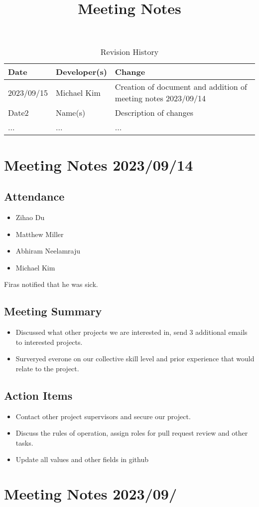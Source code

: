 \documentclass{article}
\title{Meeting Notes\\\progname}
\author{\authname}
\date{}
\begin{document}
\maketitle

\begin{table}[hp]
\caption{Revision History} \label{TblRevisionHistory}
\begin{tabularx}{\textwidth}{llX}
\toprule
\textbf{Date} & \textbf{Developer(s)} & \textbf{Change}\\
\midrule
2023/09/15 & Michael Kim & Creation of document and addition of meeting notes 2023/09/14 \\
Date2 & Name(s) & Description of changes\\
... & ... & ...\\
\bottomrule
\end{tabularx}
\end{table}

\section*{Meeting Notes 2023/09/14}

\subsection*{Attendance}
\begin{itemize}
\item Zihao Du 
\item Matthew Miller
\item Abhiram Neelamraju
\item Michael Kim
\end{itemize}
Firas notified that he was sick.

\subsection*{Meeting Summary}
\begin{itemize}
\item Discussed what other projects we are interested in, send 3 additional emails to interested projects.
\item Surveryed everone on our collective skill level and prior experience that would relate to the project.
\end{itemize}

\subsection*{Action Items}
\begin{itemize}
\item Contact other project supervisors and secure our project.
\item Discuss the rules of operation, assign roles for pull request review and other tasks.
\item Update all values and other fields in github
\end{itemize}

\section*{Meeting Notes 2023/09/}
\end{document}
